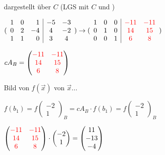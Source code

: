 \begin{multicols*}{3}
    { dargestellt über $C$ (LGS mit $C$ und )}


    {$( \begin{array}{rrr|cc}
                1 & 0 & 1  & -5 & -3 \\
                0 & 2 & -4 & 4  & -2 \\
                1 & 1 & 0  & 3  & 4
            \end{array})
            \to
            (\begin{array}{rrr|cc}
                    1 & 0 & 0 & {\color{red}-11} & {\color{red}-11} \\
                    0 & 1 & 0 & {\color{red}14}  & {\color{red}15}  \\
                    0 & 0 & 1 & {\color{red}6}   & {\color{red}8}
                \end{array})
        $}

    {$cA_B = \begin{pmatrix}
                {\color{red}-11} & {\color{red}-11} \\
                {\color{red}14}  & {\color{red}15}  \\
                {\color{red}6}   & {\color{red}8}
            \end{pmatrix}$}


    { Bild von $f(\vec{x})$ von $\vec{x} ... $}

    {$ f(b_1) = f(\begin{matrix}
                -2 \\
                1
            \end{matrix})_B = cA_B \cdot f(b_1) = f(\begin{matrix}
                -2 \\
                1
            \end{matrix})_B$}

    {$\begin{pmatrix}
                {\color{red}-11} & {\color{red}-11} \\
                {\color{red}14}  & {\color{red}15}  \\
                {\color{red}6}   & {\color{red}8}
            \end{pmatrix} \cdot \begin{pmatrix}
                -2 \\
                1
            \end{pmatrix} = \begin{pmatrix}
                11  \\
                -13 \\
                -4
            \end{pmatrix}$}


\end{multicols*}
